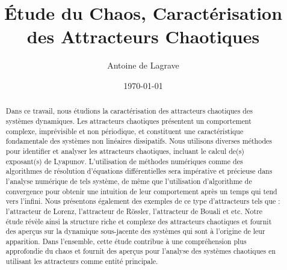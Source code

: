\documentclass[a4paper, amsfonts, amssymb, amsmath, reprint, showkeys, nofootinbib, twoside]{revtex4-2}
\begin{document}
    \title{Étude du Chaos, Caractérisation des Attracteurs Chaotiques}

    \author{Antoine de Lagrave}
    \date{\today}

    \begin{abstract}
        Dans ce travail, nous étudions la caractérisation des attracteurs
        chaotiques des systèmes dynamiques. Les attracteurs chaotiques
        présentent un comportement complexe, imprévisible et non périodique,
        et constituent une caractéristique fondamentale des systèmes non
        linéaires dissipatifs. Nous utilisons diverses méthodes pour
        identifier et analyser les attracteurs chaotiques, incluant le calcul
        de(s) exposant(s) de Lyapunov. L'utilisation de méthodes numériques
        comme des algorithmes de résolution d'équations différentielles sera
        impérative et précieuse dans l'analyse numérique de tels système, de
        même que l'utilisation d'algorithme de convergence pour obtenir une
        intuition de leur comportement après un temps qui tend vers l'infini.
        Nous présentons également des exemples de ce type d'attracteurs tels
        que : l'attracteur de Lorenz, l'attracteur de Rössler, l'attracteur de
        Bouali et etc. Notre étude révèle ainsi la structure riche et complexe
        des attracteurs chaotiques et fournit des aperçus sur la dynamique
        sous-jacente des systèmes qui sont à l'origine de leur apparition.
        Dans l'ensemble, cette étude contribue à une compréhension plus
        approfondie du chaos et fournit des aperçus pour l'analyse des
        systèmes chaotiques en utilisant les attracteurs comme entité
        principale.
    \end{abstract}

    \maketitle

    

    

    

    

    

    \appendix
    
    

    
\end{document}
